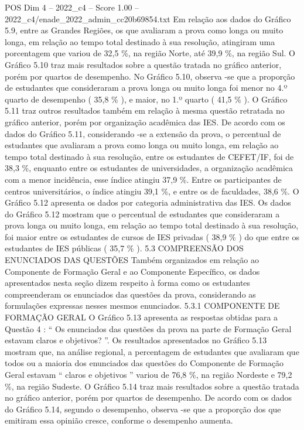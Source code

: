\begin{textsample}{POS Dim 4 – 2022\_c4 – Score 1.00 – 2022\_c4/enade\_2022\_admin\_cc20b69854.txt}
Em relação aos dados do Gráfico 5.9, entre as Grandes Regiões, os que avaliaram a prova como longa ou muito longa, em relação ao tempo total destinado à sua resolução, atingiram uma porcentagem que variou de 32,5 \%, na região Norte, até 39,9 \%, na região Sul.
O Gráfico 5.10 traz mais resultados sobre a questão tratada no gráfico anterior, porém por quartos de desempenho.
No Gráfico 5.10, observa -se que a proporção de estudantes que consideraram a prova longa ou muito longa foi menor no 4.º quarto de desempenho ( 35,8 \% ), e maior, no 1.º quarto ( 41,5 \% ).
O Gráfico 5.11 traz outros resultados também em relação à mesma questão retratada no gráfico anterior, porém por organização acadêmica das IES.
De acordo com os dados do Gráfico 5.11, considerando -se a extensão da prova, o percentual de estudantes que avaliaram a prova como longa ou muito longa, em relação ao tempo total destinado à sua resolução, entre os estudantes de CEFET/IF, foi de 38,3 \%, enquanto entre os estudantes de universidades, a organização acadêmica com a menor incidência, esse índice atingiu 37,9 \%.
Entre os participantes de centros universitários, o índice atingiu 39,1 \%, e entre os de faculdades, 38,6 \%.
O Gráfico 5.12 apresenta os dados por categoria administrativa das IES.
Os dados do Gráfico 5.12 mostram que o percentual de estudantes que consideraram a prova longa ou muito longa, em relação ao tempo total destinado à sua resolução, foi maior entre os estudantes de cursos de IES privadas ( 38,9 \% ) do que entre os estudantes de IES públicas ( 35,7 \% ). 5.3 COMPREENSÃO DOS ENUNCIADOS DAS QUESTÕES Também organizados em relação ao Componente de Formação Geral e ao Componente Específico, os dados apresentados nesta seção dizem respeito à forma como os estudantes compreenderam os enunciados das questões da prova, considerando as formulações expressas nesses mesmos enunciados. 5.3.1 COMPONENTE DE FORMAÇÃO GERAL O Gráfico 5.13 apresenta as respostas obtidas para a Questão 4 : “ Os enunciados das questões da prova na parte de Formação Geral estavam claros e objetivos? ”.
Os resultados apresentados no Gráfico 5.13 mostram que, na análise regional, a percentagem de estudantes que avaliaram que todos ou a maioria dos enunciados das questões do Componente de Formação Geral estavam “ claros e objetivos ” variou de 76,8 \%, na região Nordeste e 79,2 \%, na região Sudeste.
O Gráfico 5.14 traz mais resultados sobre a questão tratada no gráfico anterior, porém por quartos de desempenho.
De acordo com os dados do Gráfico 5.14, segundo o desempenho, observa -se que a proporção dos que emitiram essa opinião cresce, conforme o desempenho aumenta.

\end{textsample}
